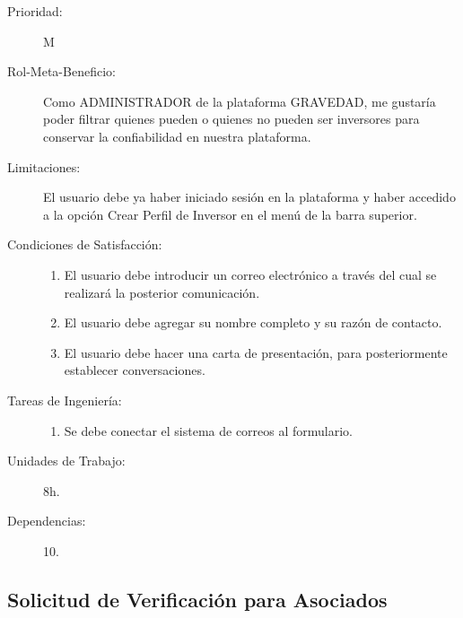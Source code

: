 \begin{description}
    \item[Prioridad:] M
    \item[Rol-Meta-Beneficio:] Como ADMINISTRADOR de la plataforma GRAVEDAD, me gustaría poder filtrar quienes pueden o quienes no pueden ser inversores para conservar la confiabilidad en nuestra plataforma.
    \item[Limitaciones:]  El usuario debe ya haber iniciado sesión en la plataforma y haber accedido a la opción Crear Perfil de Inversor en el menú de la barra superior.
    \item[Condiciones de Satisfacción:]  \hfill
        \begin{enumerate}
            \item El usuario debe introducir un correo electrónico a través del cual se realizará la posterior comunicación.
    		\item El usuario debe agregar su nombre completo y su razón de contacto.
    		\item El usuario debe hacer una carta de presentación, para posteriormente establecer conversaciones.
        \end{enumerate}
    \item[Tareas de Ingeniería:]  \hfill
        \begin{enumerate}
            \item Se debe conectar el sistema de correos al formulario.
        \end{enumerate}
    \item[Unidades de Trabajo:] 8h.
    \item[Dependencias:] 10.
\end{description}

\newpage


\subsection{Solicitud de Verificación para Asociados}

